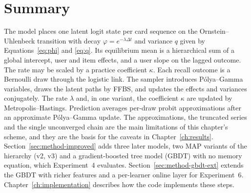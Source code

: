 \section{Summary}
\label{sec:method-summary}

The model places one latent logit state per card sequence on the Ornstein--Uhlenbeck transition
with decay $\varphi = e^{-\lambda\Delta t}$ and variance $q$ given by Equations~\eqref{eq:phi} and
\eqref{eq:q}. Its equilibrium mean is a hierarchical sum of a global intercept, user and item effects,
and a user slope on the lagged outcome. The rate may be scaled by a practice coefficient $\kappa$. Each
recall outcome is a Bernoulli draw through the logistic link. The sampler introduces
P\'olya--Gamma variables, draws the latent paths by FFBS, and updates the effects and variances
conjugately. The rate $\lambda$ and, in one variant, the coefficient $\kappa$ are updated by
Metropolis--Hastings. Prediction averages per-draw probit approximations after an approximate
P\'olya--Gamma update. The approximations, the truncated series and the single unconverged chain are
the main limitations of this chapter's scheme, and they are the basis for the caveats in
Chapter~\ref{ch:results}. Section~\ref{sec:method-improved} adds three later models, two MAP variants of the hierarchy (v2, v3) and a gradient-boosted tree model (GBDT) with no memory equation, which Experiment~4 evaluates. Section~\ref{sec:method-gbdt-ext} extends the GBDT with richer features and a per-learner online layer for Experiment~6. Chapter~\ref{ch:implementation} describes how the code implements these steps.
